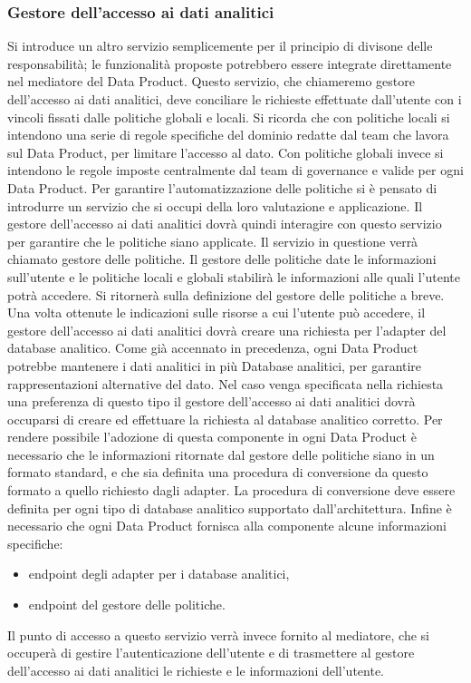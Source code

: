 \documentclass[a4paper,12pt]{report}
\begin{document}
\subsubsection{Gestore dell'accesso ai dati analitici}
Si introduce un altro servizio semplicemente per il principio di divisone delle responsabilità; le funzionalità proposte potrebbero essere integrate direttamente nel mediatore del Data Product. 
Questo servizio, che chiameremo gestore dell'accesso ai dati analitici, deve conciliare le richieste effettuate dall'utente con i vincoli fissati dalle politiche globali e locali.
Si ricorda che con politiche locali si intendono una serie di regole specifiche del dominio redatte dal team che lavora sul  Data Product, per limitare l'accesso al dato.
Con politiche globali invece si intendono le regole imposte centralmente dal team di governance e valide per ogni Data Product.
Per garantire l'automatizzazione delle politiche si è pensato di introdurre un servizio che si occupi della loro valutazione e applicazione.
Il gestore dell'accesso ai dati analitici dovrà quindi interagire con questo servizio per garantire che le politiche siano applicate.
Il servizio in questione verrà chiamato gestore delle politiche. 
Il gestore delle politiche date le informazioni sull'utente e le politiche locali e globali stabilirà le informazioni alle quali l'utente potrà accedere. 
Si ritornerà sulla definizione del gestore delle politiche a breve.
Una volta ottenute le indicazioni sulle risorse a cui l'utente può accedere, il gestore dell'accesso ai dati analitici dovrà creare una richiesta per l'adapter del database analitico.
Come già accennato in precedenza, ogni Data Product potrebbe mantenere i dati analitici in più Database analitici, per garantire rappresentazioni alternative del dato.
Nel caso venga specificata nella richiesta una preferenza di questo tipo il gestore dell'accesso ai dati analitici dovrà occuparsi di creare ed effettuare la richiesta al database analitico corretto.
Per rendere possibile l'adozione di questa componente in ogni Data Product è necessario  che le informazioni ritornate dal gestore delle politiche siano in un formato standard, e che sia definita una procedura di conversione da questo formato a quello richiesto dagli adapter.
La procedura di conversione deve essere definita per ogni tipo di database analitico supportato dall'architettura.
Infine è necessario che ogni Data Product fornisca alla componente alcune informazioni specifiche: 
\begin{itemize}
    \item endpoint degli adapter per i database analitici,
    \item endpoint del gestore delle politiche. 
\end{itemize}
Il punto di accesso a questo servizio verrà invece fornito al mediatore, che si occuperà di gestire l'autenticazione dell'utente e di trasmettere al gestore dell'accesso ai dati analitici le richieste e le informazioni dell'utente.
\end{document}
